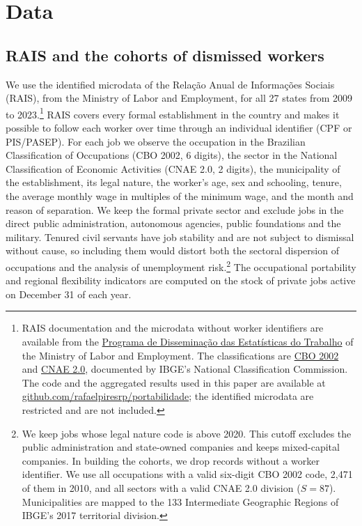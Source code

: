 \documentclass[11pt,a4paper]{article}
\let\secaoorig\section
\renewcommand{\section}{\clearpage\secaoorig}
\begin{document}
\section{Data}
\label{sec:dados}

\subsection{RAIS and the cohorts of dismissed workers}

We use the identified microdata of the Relação Anual de Informações Sociais (RAIS), from the Ministry of Labor and Employment, for all 27 states from 2009 to 2023.\footnote{RAIS documentation and the microdata without worker identifiers are available from the \href{https://www.gov.br/trabalho-e-emprego/pt-br/acesso-a-informacao/acoes-e-programas/programas-projetos-acoes-obras-e-atividades/estatisticas-trabalho/microdados-rais-e-caged}{Programa de Disseminação das Estatísticas do Trabalho} of the Ministry of Labor and Employment. The classifications are \href{https://concla.ibge.gov.br/documentacao/cronologia/cbo}{CBO 2002} and \href{https://concla.ibge.gov.br/classificacoes/por-tema/atividades-economicas/classificacao-nacional-de-atividades-economicas}{CNAE 2.0}, documented by IBGE's National Classification Commission. The code and the aggregated results used in this paper are available at \href{https://github.com/rafaelpiresrp/portabilidade}{github.com/rafaelpiresrp/portabilidade}; the identified microdata are restricted and are not included.} RAIS covers every formal establishment in the country and makes it possible to follow each worker over time through an individual identifier (CPF or PIS/PASEP). For each job we observe the occupation in the Brazilian Classification of Occupations (CBO 2002, 6 digits), the sector in the National Classification of Economic Activities (CNAE 2.0, 2 digits), the municipality of the establishment, its legal nature, the worker's age, sex and schooling, tenure, the average monthly wage in multiples of the minimum wage, and the month and reason of separation. We keep the formal private sector and exclude jobs in the direct public administration, autonomous agencies, public foundations and the military. Tenured civil servants have job stability and are not subject to dismissal without cause, so including them would distort both the sectoral dispersion of occupations and the analysis of unemployment risk.\footnote{We keep jobs whose legal nature code is above 2020. This cutoff excludes the public administration and state-owned companies and keeps mixed-capital companies. In building the cohorts, we drop records without a worker identifier. We use all occupations with a valid six-digit CBO 2002 code, 2,471 of them in 2010, and all sectors with a valid CNAE 2.0 division ($S = 87$). Municipalities are mapped to the 133 Intermediate Geographic Regions of IBGE's 2017 territorial division.} The occupational portability and regional flexibility indicators are computed on the stock of private jobs active on December 31 of each year.
\end{document}
